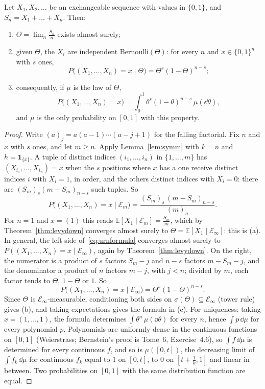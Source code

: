 \begin{theorem}[de Finetti, 1931]\label{thm:definetti}
Let $X_1,X_2,\dots$ be an exchangeable sequence with values in $\{0,1\}$, and $S_n=X_1+\dots+X_n$. Then:
\begin{enumerate}[label=(\alph*)]
\item $\Theta=\lim_n\frac{S_n}n$ exists almost surely;
\item given $\Theta$, the $X_i$ are independent Bernoulli$(\Theta)$: for every $n$ and $x\in\{0,1\}^n$ with $s$ ones,
\[
P\bigl((X_1,\dots,X_n)=x\mid\Theta\bigr)=\Theta^s(1-\Theta)^{n-s};
\]
\item consequently, if $\mu$ is the law of $\Theta$,
\[
P\bigl((X_1,\dots,X_n)=x\bigr)=\int_0^1\theta^s(1-\theta)^{n-s}\,\mu(\dd\theta),
\]
and $\mu$ is the only probability on $[0,1]$ with this property.
\end{enumerate}
\end{theorem}
\begin{proof}
Write $(a)_j=a(a-1)\cdots(a-j+1)$ for the falling factorial. Fix $n$ and $x$ with $s$ ones, and let $m\ge n$. Apply Lemma~\ref{lem:symm} with $k=n$ and $h=\mathbf 1_{\{x\}}$. A tuple of distinct indices
$(i_1,\dots,i_n)$ in $\{1,\dots,m\}$ has $(X_{i_1},\dots,X_{i_n})=x$ when the $s$ positions where $x$ has a one receive distinct indices $i$ with $X_i=1$, in order, and the others distinct indices
with $X_i=0$: there are $(S_m)_s(m-S_m)_{n-s}$ such tuples. So
\begin{equation}\label{eq:urnformula}
P\bigl((X_1,\dots,X_n)=x\mid\mathcal E_m\bigr)=\frac{(S_m)_s\,(m-S_m)_{n-s}}{(m)_n}.
\end{equation}
For $n=1$ and $x=(1)$ this reads $\mathbb E[X_1\mid\mathcal E_m]=\frac{S_m}m$, which by Theorem~\ref{thm:levydown} converges almost surely to $\Theta=\mathbb E[X_1\mid\mathcal E_\infty]$: this is (a). In general, the left side
of~\eqref{eq:urnformula} converges almost surely to $P((X_1,\dots,X_n)=x\mid\mathcal E_\infty)$, again by Theorem~\ref{thm:levydown}. On the right, the numerator is a product of $s$ factors $S_m-j$ and $n-s$ factors $m-S_m-j$, and the
denominator a product of $n$ factors $m-j$, with $j<n$; divided by $m$, each factor tends to $\Theta$, $1-\Theta$ or $1$. So
\[
P\bigl((X_1,\dots,X_n)=x\mid\mathcal E_\infty\bigr)=\Theta^s(1-\Theta)^{n-s}.
\]
Since $\Theta$ is $\mathcal E_\infty$-measurable, conditioning both sides on $\sigma(\Theta)\subseteq\mathcal E_\infty$ (tower rule) gives (b), and taking expectations gives the formula in (c).
For uniqueness: taking $x=(1,\dots,1)$, the formula determines $\int\theta^n\,\mu(\dd\theta)$ for every $n$, hence $\int p\,\dd\mu$ for every polynomial $p$. Polynomials are uniformly dense in the continuous
functions on $[0,1]$ (Weierstrass; Bernstein's proof is Tome~6, Exercise~4.6), so $\int f\,\dd\mu$ is determined for every continuous $f$, and so is $\mu([0,t])$, the decreasing limit of $\int f_k\,\dd\mu$ for
continuous $f_k$ equal to $1$ on $[0,t]$, to $0$ on $[t+\frac1k,1]$ and linear in between. Two probabilities on $[0,1]$ with the same distribution function are equal.
\end{proof}

